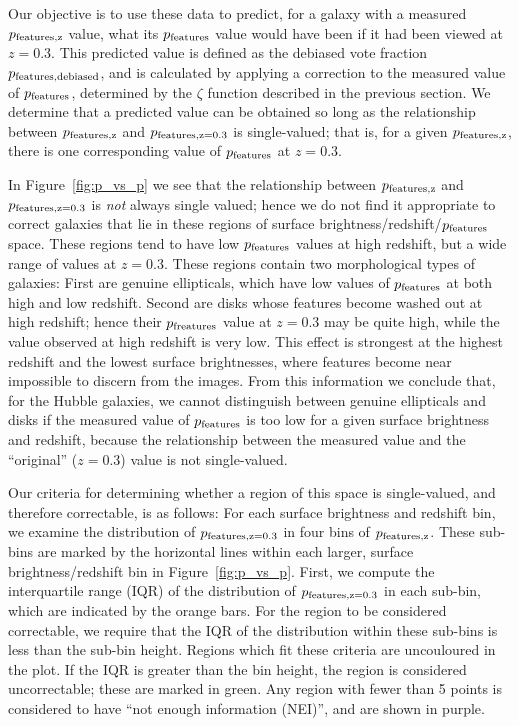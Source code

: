\documentclass[usenatbib]{mn2e}
\begin{document}
Our objective is to use these data to predict, for a galaxy with a measured $p_{\rm features,z}$ value, what its $p_{\rm features}$ value would have been if it had been viewed at $z=0.3$. This predicted value is defined as the debiased vote fraction $p_{\rm features,debiased}$, and is calculated by applying a correction to the measured value of $p_{\rm features}$, determined by the $\zeta$ function described in the previous section. We determine that a predicted value can be obtained so long as the relationship between $p_{\rm features,z}$ and $p_{\rm features,z=0.3}$ is single-valued; that is, for a given $p_{\rm features,z}$, there is one corresponding value of $p_{\rm features}$ at $z=0.3$. 



In Figure~\ref{fig:p_vs_p} we see that the relationship between $p_{\rm features,z}$ and $p_{\rm features,z=0.3}$ is \emph{not} always single valued; hence we do not find it appropriate to correct galaxies that lie in these regions of surface brightness/redshift/$p_{\rm features}$ space. These regions tend to have low $p_{\rm features}$ values at high redshift, but a wide range of values at $z=0.3$. These regions contain two morphological types of galaxies: First are genuine ellipticals, which have low values of $p_{\rm features}$ at both high and low redshift. Second are disks whose features become washed out at high redshift; hence their $p_{\rm freatures}$ value at $z=0.3$ may be quite high, while the value observed at high redshift is very low. This effect is strongest at the highest redshift and the lowest surface brightnesses, where features become near impossible to discern from the images. From this information we conclude that, for the Hubble galaxies, we cannot distinguish between genuine ellipticals and disks if the measured value of $p_{\rm features}$ is too low for a given surface brightness and redshift, because the relationship between the measured value and the ``original'' ($z=0.3$) value is not single-valued.  

Our criteria for determining whether a region of this space is single-valued, and therefore correctable, is as follows: For each surface brightness and redshift bin, we examine the distribution of $p_{\rm features,z=0.3}$ in four bins of $p_{\rm features,z}$. These sub-bins are marked by the horizontal lines within each larger, surface brightness/redshift bin in Figure~\ref{fig:p_vs_p}. First, we compute the interquartile range (IQR) of the distribution of $p_{\rm features,z=0.3}$ in each sub-bin, which are indicated by the orange bars. For the region to be considered correctable, we require that the IQR of the distribution within these sub-bins is less than the sub-bin height. Regions which fit these criteria are uncouloured in the plot. If the IQR is greater than the bin height, the region is considered uncorrectable; these are marked in green. Any region with fewer than 5 points is considered to have ``not enough information (NEI)'', and are shown in purple. 
\end{document}
